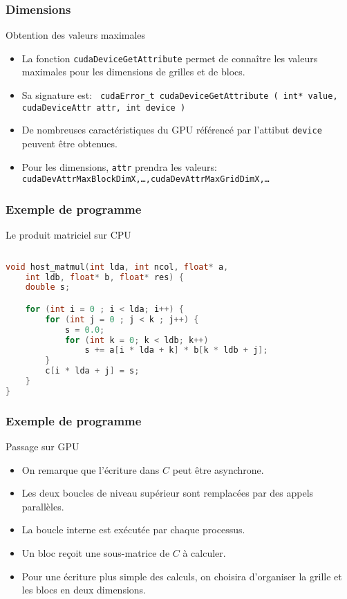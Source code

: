 \begin{frame}
    \frametitle{Dimensions}
\begin{block}{Obtention des valeurs maximales}
    \begin{itemize}
          \item<+-> La fonction \texttt{cudaDeviceGetAttribute} permet de connaître les valeurs maximales pour les dimensions de grilles
          et de blocs.
          \item<+-> Sa signature est:
        {\footnotesize \nvhost \nvdevice \texttt{ cudaError\_t cudaDeviceGetAttribute ( int* value, cudaDeviceAttr attr, int  device )}}
          \item<+-> De nombreuses caractéristiques du GPU référencé par l'attibut \texttt{device} peuvent être obtenues.
          \item<+-> Pour les dimensions,  \texttt{attr} prendra les valeurs: 
          {\footnotesize \texttt{cudaDevAttrMaxBlockDimX,\dots,cudaDevAttrMaxGridDimX,\dots }}
    \end{itemize}
\end{block}
\end{frame}
\begin{frame}[fragile]
    \frametitle{Exemple de programme}
\begin{block}{Le produit matriciel sur CPU}
    \begin{lstlisting}[basicstyle=\footnotesize,tabsize=4,language=c++]
  
void host_matmul(int lda, int ncol, float* a, 
    int ldb, float* b, float* res) {
	double s;

	for (int i = 0 ; i < lda; i++) {
		for (int j = 0 ; j < k ; j++) {
			s = 0.0;
			for (int k = 0; k < ldb; k++)
				s += a[i * lda + k] * b[k * ldb + j];
		}
		c[i * lda + j] = s;
	}
}
\end{lstlisting}
\end{block}
\end{frame}

\begin{frame}
    \frametitle{Exemple de programme}
\begin{block}{Passage sur GPU}
    \begin{itemize}
        \item<+-> On remarque que l'écriture dans $C$ peut être asynchrone.
        \item<+-> Les deux boucles de niveau supérieur sont remplacées par des appels parallèles.
        \item<+-> La boucle interne est exécutée par chaque processus.
        \item<+-> Un bloc reçoit une sous-matrice de $C$ à calculer.
        \item<+-> Pour une écriture plus simple des calculs, on choisira d'organiser la grille et les 
        blocs en deux dimensions.
    \end{itemize}
\end{block}
\end{frame}

